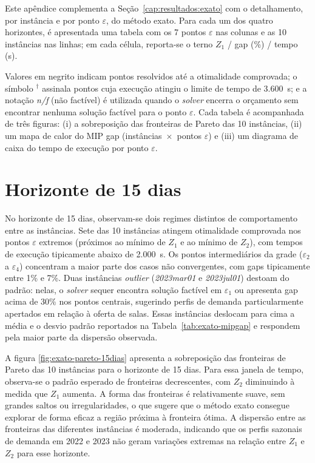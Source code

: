 Este apêndice complementa a Seção~\ref{cap:resultados:exato} com o detalhamento, por instância e por ponto $\varepsilon$, do método exato. Para cada um dos quatro horizontes, é apresentada uma tabela com os 7 pontos $\varepsilon$ nas colunas e as 10 instâncias nas linhas; em cada célula, reporta-se o terno $Z_1$ / gap (\%) / tempo (s).

Valores em negrito indicam pontos resolvidos até a otimalidade comprovada; o símbolo $^{\dagger}$ assinala pontos cuja execução atingiu o limite de tempo de 3.600~s; e a notação \emph{n/f} (não factível) é utilizada quando o \textit{solver} encerra o orçamento sem encontrar nenhuma solução factível para o ponto $\varepsilon$. Cada tabela é acompanhada de três figuras: (i) a sobreposição das fronteiras de Pareto das 10 instâncias, (ii) um mapa de calor do MIP gap (instâncias~$\times$~pontos $\varepsilon$) e (iii) um diagrama de caixa do tempo de execução por ponto $\varepsilon$.

\section{Horizonte de 15 dias}
\label{apendice:exato-h15}

No horizonte de 15 dias, observam-se dois regimes distintos de comportamento entre as instâncias. Sete das 10 instâncias atingem otimalidade comprovada nos pontos $\varepsilon$ extremos (próximos ao mínimo de $Z_1$ e ao mínimo de $Z_2$), com tempos de execução tipicamente abaixo de 2.000~s. Os pontos intermediários da grade ($\varepsilon_2$ a $\varepsilon_4$) concentram a maior parte dos casos não convergentes, com gaps tipicamente entre 1\% e 7\%. Duas instâncias \textit{outlier} (\textit{2023mar01} e \textit{2023jul01}) destoam do padrão: nelas, o \textit{solver} sequer encontra solução factível em $\varepsilon_1$ ou apresenta gap acima de 30\% nos pontos centrais, sugerindo perfis de demanda particularmente apertados em relação à oferta de salas. Essas instâncias deslocam para cima a média e o desvio padrão reportados na Tabela~\ref{tab:exato-mipgap} e respondem pela maior parte da dispersão observada.

A figura \ref{fig:exato-pareto-15dias} apresenta a sobreposição das fronteiras de Pareto das 10 instâncias para o horizonte de 15 dias. Para essa janela de tempo, observa-se o padrão esperado de fronteiras decrescentes, com $Z_2$ diminuindo à medida que $Z_1$ aumenta. A forma das fronteiras é relativamente suave, sem grandes saltos ou irregularidades, o que sugere que o método exato consegue explorar de forma eficaz a região próxima à fronteira ótima. A dispersão entre as fronteiras das diferentes instâncias é moderada, indicando que os perfis sazonais de demanda em 2022 e 2023 não geram variações extremas na relação entre $Z_1$ e $Z_2$ para esse horizonte.

